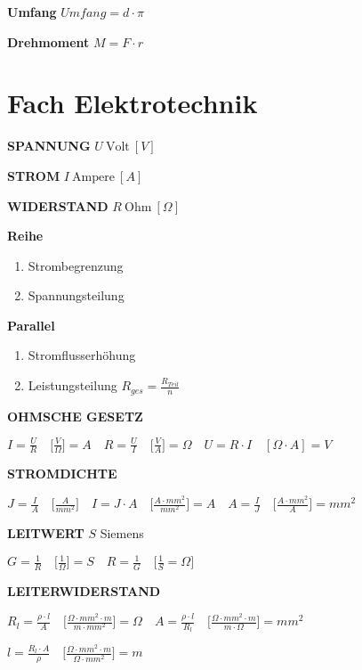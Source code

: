 \textbf{Umfang} $\boxed{Umfang = d \cdot \pi}$

\textbf{Drehmoment} $\boxed{M = F \cdot r}$

\section{Fach Elektrotechnik}\label{fach-elektrotechnik}

\textbf{SPANNUNG} $U~\text{Volt}~[V]$

\textbf{STROM} $I~\text{Ampere}~[A]$

\textbf{WIDERSTAND} $R~\text{Ohm}~[\Omega]$

\textbf{Reihe}

\begin{enumerate}
\item
  Strombegrenzung
\item
  Spannungsteilung
\end{enumerate}

\textbf{Parallel}

\begin{enumerate}
\item
  Stromflusserhöhung
\item
  Leistungsteilung $\boxed{R_{ges} = \frac{R_{Teil}}{n}}$
\end{enumerate}

\textbf{OHMSCHE GESETZ}

$\boxed{I = \frac{U}{R}} \quad \bigl[\frac{V}{\Omega}\bigl] = A \quad  \boxed{R = \frac{U}{I}} \quad \bigl[\frac{V}{A}\bigl] = \Omega \quad  \boxed{U = R \cdot I} \quad [\Omega \cdot A] = V$

\textbf{STROMDICHTE}

$\boxed{J = \frac{I}{A}} \quad \bigl[\frac{A}{mm^2}\bigl] \quad  \boxed{I = J \cdot A} \quad \bigl[\frac{A \cdot mm^2}{mm^2}\bigl] = A \quad  \boxed{A = \frac{I}{J}} \quad \bigl[\frac{A \cdot mm^2}{A}\bigl] = mm^2$

\textbf{LEITWERT} $S$ Siemens

$\boxed{G = \frac{1}{R}} \quad \bigl[\frac{1}{\Omega}\bigl] = S \quad \boxed{R = \frac{1}{G}} \quad \bigl[\frac{1}{S} = \Omega\bigl]$

\textbf{LEITERWIDERSTAND}

$\boxed{R_l = \frac{\rho \cdot l}{A}} \quad \bigl[\frac{\Omega \cdot mm^2 \cdot m}{m \cdot mm^2}\bigl] = \Omega \quad \boxed{A = \frac{\rho \cdot l}{R_l}} \quad \bigl[\frac{\Omega \cdot mm^2 \cdot m}{m \cdot \Omega}\bigl] = mm^2$

$\boxed{l = \frac{R_l \cdot A}{\rho}} \quad \bigl[\frac{\Omega \cdot mm^2 \cdot m}{\Omega \cdot mm^2}\bigl] = m$

